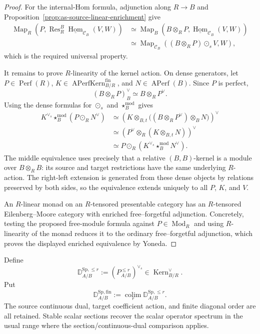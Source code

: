 \begin{proof}
For the internal-Hom formula, adjunction along $R\to B$ and
Proposition~\ref{prop:as-source-linear-enrichment} give
\[
\begin{aligned}
\operatorname{Map}_R
\left(
    P,
    \operatorname{Res}_R^B
    \underline{\operatorname{Hom}}_{\mathcal C_B}(V,W)
\right)
&\simeq
\operatorname{Map}_B
\left(
    B\otimes_RP,
    \underline{\operatorname{Hom}}_{\mathcal C_B}(V,W)
\right)\\
&\simeq
\operatorname{Map}_{\mathcal C_B}
\left((B\otimes_RP)\odot_sV,W\right),
\end{aligned}
\]
which is the required universal property.

It remains to prove $R$-linearity of the kernel action.  On dense generators,
let $P\in\operatorname{Perf}(R)$,
$K\in\operatorname{APerfKern}^{\mathrm{fin}}_{B/R}$, and
$N\in\operatorname{APerf}(B)$.  Since $P$ is perfect,
\[
    (B\otimes_RP)^\vee_B
    \simeq
    B\otimes_RP^\vee.
\]
Using the dense formulas for $\odot_s$ and $\star_B^{\mathrm{mod}}$ gives
\[
\begin{aligned}
K^{\vee_s}\star_B^{\mathrm{mod}}
(P\odot_RN^\vee)
&\simeq
\left(
K\otimes_{B,t}
\bigl((B\otimes_RP^\vee)\otimes_BN\bigr)
\right)^\vee\\
&\simeq
\left(
P^\vee\otimes_R
(K\otimes_{B,t}N)
\right)^\vee\\
&\simeq
P\odot_R
\left(K^{\vee_s}\star_B^{\mathrm{mod}}N^\vee\right).
\end{aligned}
\]
The middle equivalence uses precisely that a relative $(B,B)$-kernel is a
module over $B\otimes_RB$: its source and target restrictions have the same
underlying $R$-action.  The right-left extension is generated from these
dense objects by relations preserved by both sides, so the equivalence
extends uniquely to all $P$, $K$, and $V$.

An $R$-linear monad on an $R$-tensored presentable category has an
$R$-tensored Eilenberg--Moore category with enriched free--forgetful
adjunction.  Concretely, testing the proposed free-module formula against
$P\in\operatorname{Mod}_R$ and using $R$-linearity of the monad reduces it to
the ordinary free--forgetful adjunction, which proves the displayed enriched
equivalence by Yoneda.
\end{proof}

\begin{definition}
\label{def:as-internal-distributions}
Define
\[
\boxed{
    \mathbb D_{A/B}^{\mathrm{Sp},\le r}
    :=
    \left(P_{A/B}^{\le r}\right)^{\vee_s}
    \in
    \operatorname{Kern}^{\vee}_{B/R}.
}
\]
Put
\[
\boxed{
    \mathbb D_{A/B}^{\mathrm{Sp,fin}}
    :=
    \operatorname*{colim}_r
    \mathbb D_{A/B}^{\mathrm{Sp},\le r}.
}
\]
The source continuous dual, target coefficient action, and finite diagonal
order are all retained.  Stable scalar sections recover the scalar operator
spectrum in the usual range where the section/continuous-dual comparison
applies.
\end{definition}


